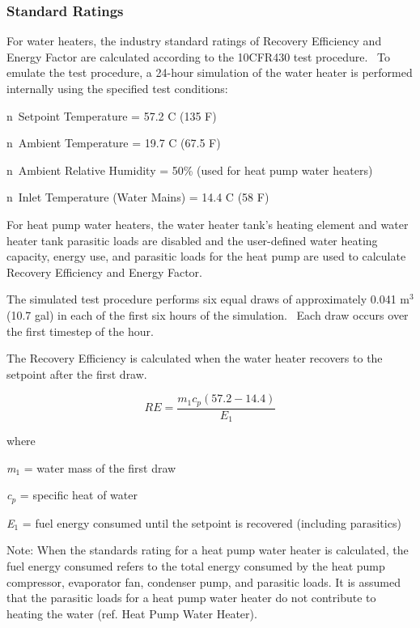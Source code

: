 \subsubsection{Standard Ratings}\label{standard-ratings}

For water heaters, the industry standard ratings of Recovery Efficiency and Energy Factor are calculated according to the 10CFR430 test procedure.~ To emulate the test procedure, a 24-hour simulation of the water heater is performed internally using the specified test conditions:

n~Setpoint Temperature = 57.2 C (135 F)

n~Ambient Temperature = 19.7 C (67.5 F)

n~Ambient Relative Humidity = 50\% (used for heat pump water heaters)

n~Inlet Temperature (Water Mains) = 14.4 C (58 F)

For heat pump water heaters, the water heater tank's heating element and water heater tank parasitic loads are disabled and the user-defined water heating capacity, energy use, and parasitic loads for the heat pump are used to calculate Recovery Efficiency and Energy Factor.

The simulated test procedure performs six equal draws of approximately 0.041 m\(^{3}\) (10.7 gal) in each of the first six hours of the simulation.~ Each draw occurs over the first timestep of the hour.

The Recovery Efficiency is calculated when the water heater recovers to the setpoint after the first draw.

\begin{equation}
RE = \frac{{{m_1}{c_p}\left( {57.2 - 14.4} \right)}}{{{E_1}}}
\end{equation}

where

\emph{m\(_{1}\)} = water mass of the first draw

\emph{c\(_{p}\)} = specific heat of water

\emph{E\(_{1}\)} = fuel energy consumed until the setpoint is recovered (including parasitics)

Note: When the standards rating for a heat pump water heater is calculated, the fuel energy consumed refers to the total energy consumed by the heat pump compressor, evaporator fan, condenser pump, and parasitic loads. It is assumed that the parasitic loads for a heat pump water heater do not contribute to heating the water (ref. Heat Pump Water Heater).

